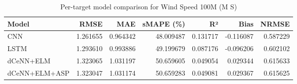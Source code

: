 \begin{table}
\caption{Per-target model comparison for Wind Speed 100M (M S)}
\begin{tabular}{lrrrrrr}
\toprule
Model & RMSE & MAE & sMAPE (\%) & R² & Bias & NRMSE \\
\midrule
CNN & 1.261655 & 0.964342 & 48.009487 & 0.131717 & -0.116087 & 0.587229 \\
LSTM & 1.293610 & 0.993886 & 49.199679 & 0.087176 & -0.096206 & 0.602102 \\
dCeNN+ELM & 1.323065 & 1.031197 & 50.659605 & 0.049054 & 0.029344 & 0.615633 \\
dCeNN+ELM+ASP & 1.323047 & 1.031174 & 50.659283 & 0.049081 & 0.029367 & 0.615625 \\
\bottomrule
\end{tabular}
\end{table}
